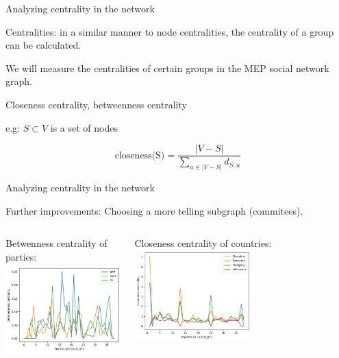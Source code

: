 \documentclass{beamer}
\begin{document}
\begin{frame}{Analyzing centrality in the network}
	
	Centralities: in a similar manner to node centralities, the centrality of a group can be calculated. 
	
	\vspace{2mm}
	
	\pause We will measure the centralities of certain groups in the MEP social network graph. 
	
	\vspace{2mm}
	
	\pause Closeness centrality, betweenness centrality
	
	\vspace{2mm} \pause e.g: $S \subset V$ is a set of nodes 
	
	\[
		\text{closeness(S)} = \frac{|V-S|}{\sum_{u \in |V-S|}d_{S,u} }
	\]
	
\end{frame}

\begin{frame}{Analyzing centrality in the network}
	
	Further improvements: Choosing a more telling subgraph (commitees).
	\vspace{4mm}
	\pause
	
	\begin{columns}
	\column{5cm}
	Betwenness centrality of parties:
	\\
	\includegraphics[height=3.5cm]{img/BTW_group_centrality_party_biggest3.png}

	\pause \column{5cm}
	Closeness centrality of countries:
	\includegraphics[height=3.5cm]{img/Closeness_group_centrality_country_close_4.png}

	\end{columns}
	
\end{frame}
\end{document}
